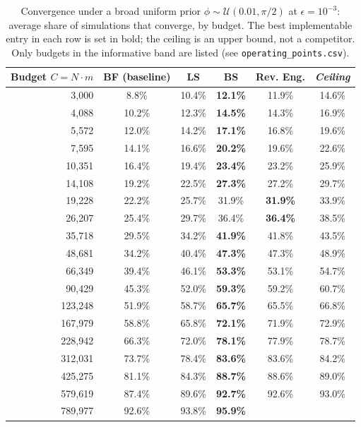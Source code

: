 \begin{table}[ht]
\centering
\small
\caption{Convergence under a broad uniform prior $\phi\sim\mathcal{U}(0.01,\pi/2)$ at $\epsilon=10^{-3}$: average share of simulations that converge, by budget. The best implementable entry in each row is set in bold; the ceiling is an upper bound, not a competitor. Only budgets in the informative band are listed (see \texttt{operating\_points.csv}).}
\label{tab:broad-pi2}
\begin{tabular}{rccccc}
\toprule
Budget $C=N\cdot m$
& BF (baseline)
& LS
& BS
& Rev. Eng.
& \textit{Ceiling} \\
\midrule
3{,}000
& 8.8\%
& 10.4\%
& \textbf{12.1\%}
& 11.9\%
& 14.6\% \\
4{,}088
& 10.2\%
& 12.3\%
& \textbf{14.5\%}
& 14.3\%
& 16.9\% \\
5{,}572
& 12.0\%
& 14.2\%
& \textbf{17.1\%}
& 16.8\%
& 19.6\% \\
7{,}595
& 14.1\%
& 16.6\%
& \textbf{20.2\%}
& 19.6\%
& 22.6\% \\
10{,}351
& 16.4\%
& 19.4\%
& \textbf{23.4\%}
& 23.2\%
& 25.9\% \\
14{,}108
& 19.2\%
& 22.5\%
& \textbf{27.3\%}
& 27.2\%
& 29.7\% \\
19{,}228
& 22.2\%
& 25.7\%
& 31.9\%
& \textbf{31.9\%}
& 33.9\% \\
26{,}207
& 25.4\%
& 29.7\%
& 36.4\%
& \textbf{36.4\%}
& 38.5\% \\
35{,}718
& 29.5\%
& 34.2\%
& \textbf{41.9\%}
& 41.8\%
& 43.5\% \\
48{,}681
& 34.2\%
& 40.4\%
& \textbf{47.3\%}
& 47.3\%
& 48.9\% \\
66{,}349
& 39.4\%
& 46.1\%
& \textbf{53.3\%}
& 53.1\%
& 54.7\% \\
90{,}429
& 45.3\%
& 52.0\%
& \textbf{59.3\%}
& 59.2\%
& 60.7\% \\
123{,}248
& 51.9\%
& 58.7\%
& \textbf{65.7\%}
& 65.5\%
& 66.8\% \\
167{,}979
& 58.8\%
& 65.8\%
& \textbf{72.1\%}
& 71.9\%
& 72.9\% \\
228{,}942
& 66.3\%
& 72.0\%
& \textbf{78.1\%}
& 77.9\%
& 78.7\% \\
312{,}031
& 73.7\%
& 78.4\%
& \textbf{83.6\%}
& 83.6\%
& 84.2\% \\
425{,}275
& 81.1\%
& 84.3\%
& \textbf{88.7\%}
& 88.6\%
& 89.0\% \\
579{,}619
& 87.4\%
& 89.6\%
& \textbf{92.7\%}
& 92.6\%
& 93.0\% \\
789{,}977
& 92.6\%
& 93.8\%
& \textbf{95.9\%}

\end{tabular}
\end{table}
